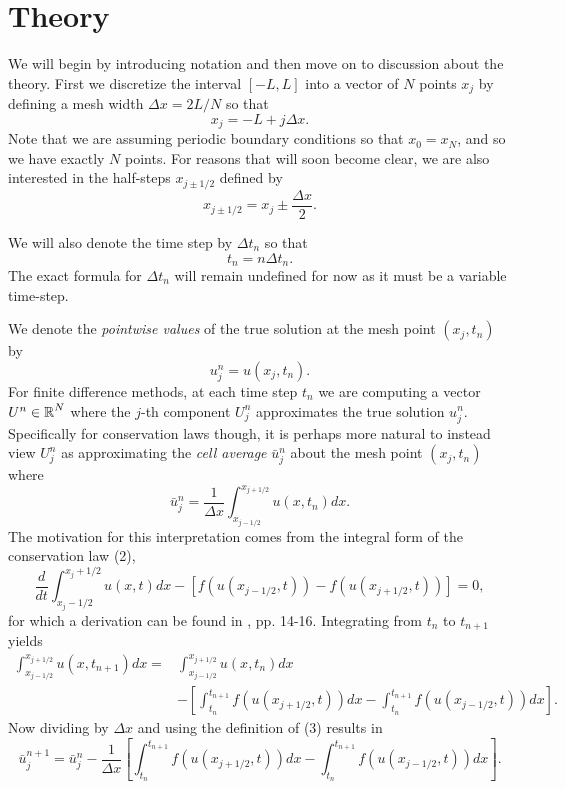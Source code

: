 \documentclass{myproject}
\begin{document}
\pagebreak
\section{Theory}

We will begin by introducing notation and then move on to discussion about the theory. First we discretize the interval $[-L,L]$ into a vector of $N$ points $x_j$ by defining a mesh width $\Delta x = 2L/N$ so that 
\[
    x_j = -L + j\Delta x.
\]
Note that we are assuming periodic boundary conditions so that $x_0 = x_{N}$, and so we have exactly $N$ points. For reasons that will soon become clear, we are also interested in the half-steps $x_{j\pm1/2}$ defined by
\[
    x_{j\pm1/2} = x_j \pm \frac{\Delta x}{2}.
\]

We will also denote the time step by $\Delta t_n$ so that
\[
    t_n = n\Delta t_n.
\]
The exact formula for $\Delta t_n$ will remain undefined for now as it must be a variable time-step.

We denote the \emph{pointwise values} of the true solution at the mesh point $(x_j, t_n)$ by 
\[
    u_j^n = u(x_j,t_n).
\]
For finite difference methods, at each time step $t_n$ we are computing a vector $U^n \in \operatorname{\mathbb{R}}^N$ where the $j$-th component $U_j^n$ approximates the true solution $u_j^n$. Specifically for conservation laws though, it is perhaps more natural to instead view $U_j^n$ as approximating the \emph{cell average} $\bar{u}_j^n$ about the mesh point $(x_j,t_n)$ where
\begin{equation}
    \bar{u}_j^n = \frac{1}{\Delta x} \int_{x_{j-1/2}}^{x_{j+1/2}} u(x,t_n) dx.
\end{equation}
The motivation for this interpretation comes from the integral form of the conservation law (2),
\[
    \frac{d}{dt} \int_{x_j-1/2}^{x_j+1/2} u(x,t)dx - \left[ f(u(x_{j-1/2},t)) - f(u(x_{j+1/2},t)) \right] = 0,
\]
for which a derivation can be found in \cite{leveque1992}, pp. 14-16. Integrating from $t_n$ to $t_{n+1}$ yields
\begin{align*}
    \int_{x_{j-1/2}}^{x_{j+1/2}} u(x,t_{n+1}) dx = &\int_{x_{j-1/2}}^{x_{j+1/2}} u(x,t_{n}) dx \\
    &- \left[ \int_{t_n}^{t_{n+1}} f(u(x_{j+1/2},t)) dx - \int_{t_n}^{t_{n+1}} f(u(x_{j-1/2},t)) dx \right].
\end{align*}
Now dividing by $\Delta x$ and using the definition of (3) results in
\begin{equation}
    \bar{u}_j^{n+1} = \bar{u}_j^n - \frac{1}{\Delta x}\left[ \int_{t_n}^{t_{n+1}} f(u(x_{j+1/2},t)) dx - \int_{t_n}^{t_{n+1}} f(u(x_{j-1/2},t)) dx \right].
\end{equation}
\end{document}
